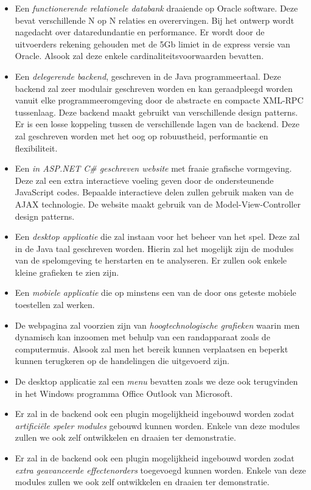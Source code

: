 \begin{itemize}
\item Een \emph{functionerende relationele databank} draaiende op Oracle software. Deze bevat verschillende N op N relaties en overervingen. Bij het ontwerp wordt nagedacht over dataredundantie en performance. Er wordt door de uitvoerders rekening gehouden met de 5Gb limiet in de express versie van Oracle. Alsook zal deze enkele cardinaliteitsvoorwaarden bevatten.
\item Een \emph{delegerende backend}, geschreven in de Java programmeertaal. Deze backend zal zeer modulair geschreven worden en kan geraadpleegd worden vanuit elke programmeeromgeving door de abstracte en compacte XML-RPC tussenlaag. Deze backend maakt gebruikt van verschillende design patterns. Er is een losse koppeling tussen de verschillende lagen van de backend. Deze zal geschreven worden met het oog op robuustheid, performantie en flexibiliteit.
\item Een \emph{in ASP.NET C\# geschreven website} met fraaie grafische vormgeving. Deze zal een extra interactieve voeling geven door de ondersteunende JavaScript codes. Bepaalde interactieve delen zullen gebruik maken van de AJAX technologie. De website maakt gebruik van de Model-View-Controller design patterns.
\item Een \emph{desktop applicatie} die zal instaan voor het beheer van het spel. Deze zal in de Java taal geschreven worden. Hierin zal het mogelijk zijn de modules van de spelomgeving te herstarten en te analyseren. Er zullen ook enkele kleine grafieken te zien zijn.
\item Een \emph{mobiele applicatie} die op minstens een van de door ons geteste mobiele toestellen zal werken.
\item De webpagina zal voorzien zijn van \emph{hoogtechnologische grafieken} waarin men dynamisch kan inzoomen met behulp van een randapparaat zoals de computermuis. Alsook zal men het bereik kunnen verplaatsen en beperkt kunnen terugkeren op de handelingen die uitgevoerd zijn.
\item De desktop applicatie zal een \emph{menu} bevatten zoals we deze ook terugvinden in het Windows programma Office Outlook van Microsoft.
\item Er zal in de backend ook een plugin mogelijkheid ingebouwd worden zodat \emph{artifici\"ele speler modules} gebouwd kunnen worden. Enkele van deze modules zullen we ook zelf ontwikkelen en draaien ter demonstratie.
\item Er zal in de backend ook een plugin mogelijkheid ingebouwd worden zodat \emph{extra geavanceerde effectenorders} toegevoegd kunnen worden. Enkele van deze modules zullen we ook zelf ontwikkelen en draaien ter demonstratie.

\end{itemize}
